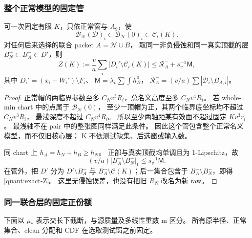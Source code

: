 \subsubsection{整个正常模型的固定管}

\begin{lemma}\label{quant:fixed-tube}
可一次固定有限 \(K\)，只依正常窗与 \(A_9\)，使
\[
 \mathscr B_{\mathcal N}(\mathscr D)_i
 \subset\mathscr B_{\mathcal N}(0)_i\subset\mathcal C_i(K).
\]
对任何后来选择的联合 packet \(A=\mathcal N\cup B\)，
取同一非负侵蚀和同一真实顶截的层
\(B_N^-\subset B_A^-\subset D'\)，则
\begin{equation}\label{quant:exact-Z}
 Z(K):=\frac va\sum_i|D_i'\setminus\mathcal C_i(K)|
 \le\mathcal R_A^-+s_v^{-1}\mathsf M,
\end{equation}
其中 \(D_i'= (x_i+W_i')\setminus F_i\)、
\(\mathsf M=\lambda_v\sum\int h_B^0\)，
\(\mathcal R_A^-=(v/a)\sum|\mathscr D_i\setminus B_{A,i}^-|\)。
\end{lemma}
\begin{proof}
正常帽的两临界参数至多 \(C_Nv^3R_i\)，总名义高度至多 \(C_Nv^4R_i\)。
若 whole-min chart 中的点属于 \(\mathscr B_{\mathcal N}(0)\)，
至少一顶帽为正，其两个临界底坐标均不超过 \(C_Nv^3R_i\)，
最浅深度不超过 \(C_Nv^4R_i\)。
所以至少两轴距某有效面不超过固定 \(Kv^3r_i\)。
最浅轴不在 pair 中的整张图同样满足此条件。
因此这个管包含整个正常名义模型，而不仅旧核心层；
K 不依测试缺集、后选窗或输入数。

同 chart 上 \(h_A=h_N+h_B\ge h_N\)。
正部与真实顶截均单调且为 1-Lipschitz，故
\[
 (v/a)|B_A^-\setminus B_N^-|_1\le s_v^{-1}\mathsf M.
\]
在管外，把 \(D'\) 分为 \(D'\setminus B_A^-\) 与
\(B_A^-\setminus\mathcal C(K)\)；后一集合包含于
\(B_A^-\setminus B_N^-\)，即得 \eqref{quant:exact-Z}。
这里无侵蚀误差，也没有把旧 \(R_N\) 改名为新 raw。
\end{proof}

\subsubsection{同一联合层的固定正份额}

下面以 \(\mu_*\) 表示交长下截断，与源质量及多线性重数 m 区分。
所有原半径、正常集合、clean 分配和 CDF 在选取测试窗之前固定。

